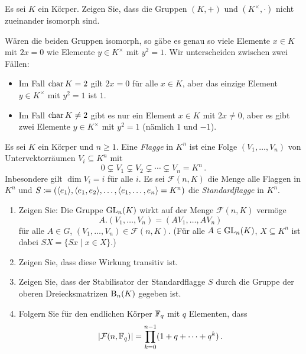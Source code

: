 \begin{question}
  Es sei $K$ ein Körper.
  Zeigen Sie, dass die Gruppen $(K,+)$ und $(K^\times, \cdot)$ nicht zueinander isomorph sind.
\end{question}


\begin{solution}
  Wären die beiden Gruppen isomorph, so gäbe es genau so viele Elemente $x \in K$ mit $2x = 0$ wie Elemente $y \in K^\times$ mit $y^2 = 1$.
  Wir unterscheiden zwischen zwei Fällen:
  \begin{itemize}
    \item 
      Im Fall $\operatorname{char} K = 2$ gilt $2x = 0$ für alle $x \in K$, aber das einzige Element $y \in K^\times$ mit $y^2 = 1$ ist $1$.
    \item
      Im Fall $\operatorname{char} K \neq 2$ gibt es nur ein Element $x \in K$ mit $2x \neq 0$, aber es gibt zwei Elemente $y \in K^\times$ mit $y^2 = 1$ (nämlich $1$ und $-1$).
  \end{itemize}
\end{solution}


\begin{question}[subtitle = Flaggen]
  Es sei $K$ ein Körper und $n \geq 1$.
  Eine \emph{Flagge} in $K^n$ ist eine Folge $(V_1, \dotsc, V_n)$ von Untervektorräumen $V_i \subseteq K^n$ mit
  \[
                0
    \subsetneq  V_1
    \subsetneq  V_2
    \subsetneq  \dotsb
    \subsetneq  V_n
    =           K^n \,.
  \]
  Inbesondere gilt $\dim V_i = i$ für alle $i$.
  Es sei $\mathcal{F}(n,K)$ die Menge alle Flaggen in $K^n$ und $S \coloneqq (\langle e_1\rangle, \langle e_1, e_2\rangle, \dotsc, \langle e_1, \dotsc, e_n\rangle = K^n)$ die \emph{Standardflagge} in $K^n$.
  \begin{enumerate}
    \item
      Zeigen Sie:
      Die Gruppe $\operatorname{GL}_n(K)$ wirkt auf der Menge $\mathcal{F}(n,K)$ vermöge
      \[
          A.(V_1, \dotsc, V_n)
        = (A V_1, \dotsc, A V_n)
      \]
      für alle $A \in G$, $(V_1, \dotsc, V_n) \in \mathcal{F}(n,K)$.
      (Für alle $A \in \operatorname{GL}_n(K)$, $X \subseteq K^n$ ist dabei $SX = \{Sx \mid x \in X\}$.)
    \item
      Zeigen Sie, dass diese Wirkung transitiv ist.
    \item
      Zeigen Sie, dass der Stabilisator der Standardflagge $S$ durch die Gruppe der oberen Dreiecksmatrizen $\operatorname{B}_n(K)$ gegeben ist.
    \item
      Folgern Sie für den endlichen Körper $\mathbb{F}_q$ mit $q$ Elementen, dass
      \[
          |\mathcal{F}(n,\mathbb{F}_q)|
        = \prod_{k=0}^{n-1} (1 + q + \dotsb + q^k) \,.
      \]
  \end{enumerate}
\end{question}


